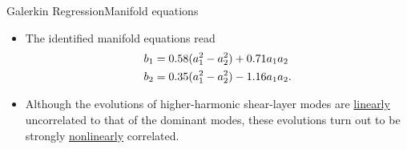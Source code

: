 \documentclass[usenames,dvipsnames,svgnames,10pt,aspectratio=169]{beamer}
\begin{document}
\begin{frame}[t, c]{Galerkin Regression}{Manifold equations}

	\begin{itemize}
		\item The identified manifold equations read
		\begin{equation}
			\begin{aligned}
				& b_1 = 0.58 (a_1^2 - a_2^2) + 0.71 a_1 a_2 \\
				& b_2 = 0.35 (a_1^2 - a_2^2) - 1.16 a_1 a_2.
			\end{aligned}
			\notag
		\end{equation}

		\medskip

		\item Although the evolutions of higher-harmonic shear-layer modes are \underline{linearly} uncorrelated to that of the dominant modes, these evolutions turn out to be strongly \underline{nonlinearly} correlated.
	\end{itemize}

	\vspace{1cm}
\end{frame}
\end{document}
